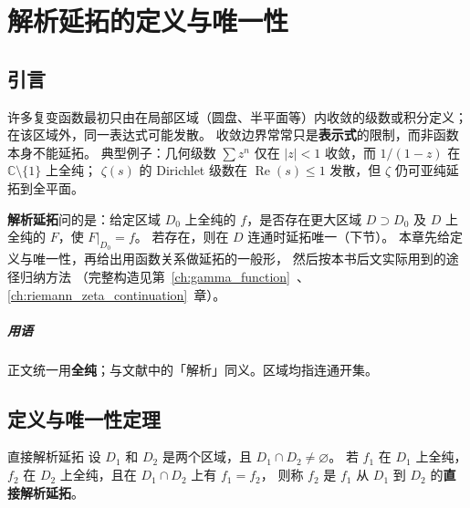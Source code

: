
\chapter{解析延拓的定义与唯一性}\label{ch:analytic_continuation_general}

\section{引言}\label{sec:intro_why_continuation}

许多复变函数最初只由在局部区域（圆盘、半平面等）内收敛的级数或积分定义；在该区域外，同一表达式可能发散。
收敛边界常常只是\textbf{表示式}的限制，而非函数本身不能延拓。
典型例子：几何级数 $\sum z^n$ 仅在 $|z|<1$ 收敛，而 $1/(1-z)$ 在 $\mathbb{C}\setminus\{1\}$ 上全纯；
$\zeta(s)$ 的 Dirichlet 级数在 $\operatorname{Re}(s)\le 1$ 发散，但 $\zeta$ 仍可亚纯延拓到全平面。

\textbf{解析延拓}问的是：给定区域 $D_0$ 上全纯的 $f$，是否存在更大区域 $D\supset D_0$ 及 $D$ 上全纯的 $F$，使 $F|_{D_0}=f$。
若存在，则在 $D$ 连通时延拓唯一（下节）。
本章先给定义与唯一性，再给出用函数关系做延拓的一般形，
然后按本书后文实际用到的途径归纳方法
（完整构造见第~\ref{ch:gamma_function}~、\ref{ch:riemann_zeta_continuation}~章）。

\paragraph{用语}
正文统一用\textbf{全纯}；与文献中的「解析」同义。区域均指连通开集。


\section{定义与唯一性定理}\label{sec:definition_and_uniqueness}

\begin{definition}{直接解析延拓}{}
设 $D_1$ 和 $D_2$ 是两个区域，且 $D_1\cap D_2\neq\varnothing$。
若 $f_1$ 在 $D_1$ 上全纯，$f_2$ 在 $D_2$ 上全纯，且在 $D_1\cap D_2$ 上有 $f_1=f_2$，
则称 $f_2$ 是 $f_1$ 从 $D_1$ 到 $D_2$ 的\textbf{直接解析延拓}。
\end{definition}

